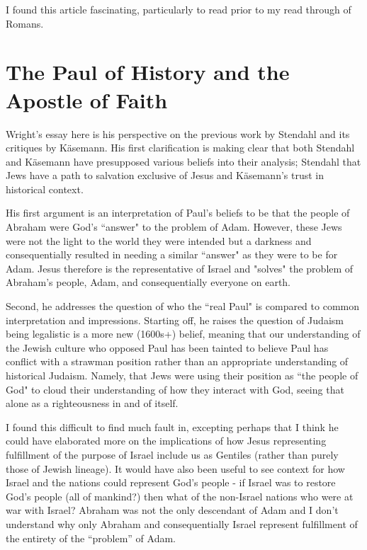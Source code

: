 \documentclass[12pt]{turabian-researchpaper}
\begin{document}
I found this article fascinating, particularly to read prior to my read through of Romans. 


\section{The Paul of History and the Apostle of Faith\autocite{wright78}}

Wright's essay here is his perspective on the previous work by Stendahl and its critiques by Käsemann.  His first clarification is making clear that both Stendahl and Käsemann have presupposed various beliefs into their analysis; Stendahl that Jews have a path to salvation exclusive of Jesus and Käsemann's trust in historical context.

His first argument is an interpretation of Paul's beliefs to be that the people of Abraham were God's ``answer" to the problem of Adam. However, these Jews were not the light to the world they were intended but a darkness and consequentially resulted in needing a similar ``answer" as they were to be for Adam. Jesus therefore is the representative of Israel and "solves" the problem of Abraham's people, Adam, and consequentially everyone on earth.

Second, he addresses the question of who the ``real Paul" is compared to common interpretation and impressions. Starting off, he raises the question of Judaism being legalistic is a more new (1600s+) belief, meaning that our understanding of the Jewish culture who opposed Paul has been tainted to believe Paul has conflict with a strawman position rather than an appropriate understanding of historical Judaism. Namely, that Jews were using their position as ``the people of God" to cloud their understanding of how they interact with God, seeing that alone as a righteousness in and of itself.

I found this difficult to find much fault in, excepting perhaps that I think he could have elaborated more on the implications of how Jesus representing fulfillment of the purpose of Israel include us as Gentiles (rather than purely those of Jewish lineage). It would have also been useful to see context for how Israel and the nations could represent God's people - if Israel was to restore God's people (all of mankind?) then what of the non-Israel nations who were at war with Israel? Abraham was not the only descendant of Adam and I don't understand why only Abraham and consequentially Israel represent fulfillment of the entirety of the ``problem'' of Adam.
\newpage


\printbibliography
\end{document}
